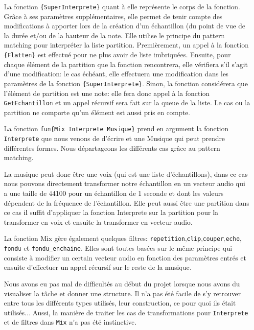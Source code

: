 \documentclass[a4paper,12pt,oneside ]{article}
\begin{document}
	La fonction \texttt{\{SuperInterprete\}} quant à elle représente le corps de la fonction. Grâce à ses paramètres supplémentaires, elle permet de tenir compte des modifications à apporter lors de la création d'un échantillon (du point de vue de la durée et/ou de la hauteur de la note. Elle utilise le principe du pattern matching pour interpréter la liste partition. Premièrement, un appel à la fonction \texttt{\{Flatten\}} est effectué pour ne plus avoir de liste imbriquées. Ensuite, pour chaque élément de la partition que la fonction rencontrera, elle vérifiera s'il s'agit d'une modification: le cas échéant, elle effectuera une modification dans les paramètres de la fonction \texttt{\{SuperInterprete\}}. Sinon, la fonction considérera que l'élément de partition est une note: elle fera donc appel à la fonction \texttt{GetEchantillon} et un appel récursif sera fait sur la queue de la liste. Le cas ou la partition ne comporte qu'un élément est aussi pris en compte.
	
	La fonction \texttt{fun\{Mix Interprete Musique\}} prend en argument la fonction \texttt{Interprete} que nous venons de d'écrire et une Musique qui peut prendre différentes formes. Nous départageons les différents cas grâce au pattern matching.
	
	La musique peut donc être une voix (qui est une liste d'échantillons), dans ce cas nous pouvons directement transformer notre échantillon en un vecteur audio qui a une taille de 44100 pour un échantillon de 1 seconde et dont les valeurs dépendent de la fréquence de l'échantillon. Elle peut aussi être une partition dans ce cas il suffit d'appliquer la fonction Interprete sur la partition pour la transformer en voix et ensuite la transformer en vecteur audio. 
	
	La fonction Mix gère également quelques filtres: \texttt{repetition},\texttt{clip},\texttt{couper},\texttt{echo}, \texttt{fondu} et \texttt{fondu\_enchaine}. Elles sont toutes basées sur le même principe qui consiste à modifier un certain vecteur audio en fonction des paramètres entrés et ensuite d'effectuer un appel récursif sur le reste de la musique.
	
	Nous avons eu pas mal de difficultés au début du projet lorsque nous avons du visualiser la tâche et donner une structure. Il n'a pas été facile de s'y retrouver entre tous les différents types utilisés, leur construction, ce pour quoi ils était utilisés... Aussi, la manière de traiter les cas de transformations pour \texttt{Interprete} et de filtres dans \texttt{Mix} n'a pas été instinctive.
	
\end{document}
